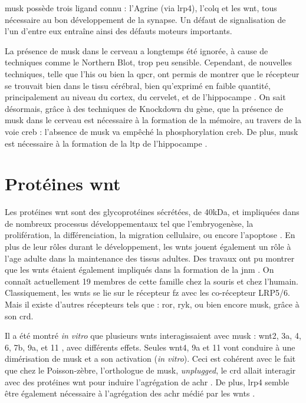 	\gls{musk} possède trois ligand connu : l'Agrine (via \gls{lrp4}), l'\gls{colq} et les \gls{wnt}, tous nécessaire au bon développement de la synapse. Un défaut de signalisation de l'un d'entre eux entraîne ainsi des défauts moteurs importants.
	
	La présence de \gls{musk} dans le cerveau a longtemps été ignorée, à cause de techniques comme le Northern Blot, trop peu sensible. Cependant, de nouvelles techniques, telle que l'\gls{his} ou bien la \gls{qpcr}, ont permis de montrer que le récepteur se trouvait bien dans le tissu cérébral, bien qu'exprimé en faible quantité, principalement au niveau du cortex, du cervelet, et de l'hippocampe \cite{Garcia-Osta2006, Ksiazek2007}. On sait désormais, grâce à des techniques de Knockdown du gène, que la présence de \gls{musk} dans le cerveau est nécessaire à la formation de la mémoire, au travers de la voie \gls{creb} : l'absence de \gls{musk} va empêché la phosphorylation \gls{creb}. De plus, \gls{musk} est nécessaire à la formation de la \gls{ltp} de l'hippocampe \cite{Garcia-Osta2006}.
	
\section{Protéines \gls{wnt}}
	\label{sec:IntroWnt}
	
	Les protéines \gls{wnt} sont des glycoprotéines sécrétées, de 40kDa, et impliquées dans de nombreux processus développementaux tel que l'embryogenèse, la prolifération, la différenciation, la migration cellulaire, ou encore l'apoptose \cite{Miller2002, Willert2012a}. En plus de leur rôles durant le développement, les \glspl{wnt} jouent également un rôle à l'age adulte dans la maintenance des tissus adultes. Des travaux ont pu montrer que les \glspl{wnt} étaient également impliqués dans la formation de la \gls{jnm} \cite{Hall2000}. On connaît actuellement 19 membres de cette famille chez la souris et chez l'humain. Classiquement, les \Glspl{wnt} se lie sur le récepteur \gls{fz} avec les co-récepteur LRP5/6. Mais il existe d'autres récepteurs tels que : \gls{ror}, \gls{ryk}, ou bien encore \gls{musk}, grâce à son \gls{crd}.
	
	Il a été montré \emph{in vitro} que plusieurs \glspl{wnt} interagissaient avec \gls{musk} : \gls{wnt}2, 3a, 4, 6, 7b, 9a, et 11 \cite{Strochlic2012, Zhang2012, Barik2014}, avec différents effets. Seules \gls{wnt}4, 9a et 11 vont conduire à une dimérisation de \gls{musk} et a son activation (\emph{in vitro}). Ceci est cohérent avec le fait que chez le Poisson-zèbre, l'orthologue de \gls{musk}, \emph{unplugged}, le \gls{crd} allait interagir avec des protéines \gls{wnt} pour induire l'agrégation de \gls{achr} \cite{Jing2009, Gordon2012}. De plus, \gls{lrp4} semble être également nécessaire à l'agrégation des \gls{achr} médié par les \gls{wnt}s \cite{Zhang2012}.
	
